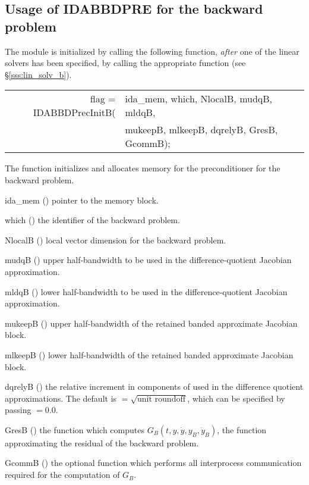 \subsection{Usage of IDABBDPRE for the backward problem}
The {\idabbdpre} module is initialized by calling the following function,
{\em after} one of the {\idaspils} linear solvers has been specified,
by calling the appropriate function (see \S\ref{sss:lin_solv_b}).
{
  \begin{tabular}[t]{@{}r@{}l@{}}
    flag = IDABBDPrecInitB(&ida\_mem, which, NlocalB, mudqB, mldqB,\\
                           &mukeepB, mlkeepB, dqrelyB, GresB, GcommB);
  \end{tabular}
}
{
  The function  initializes and allocates
  memory for the {\idabbdpre} preconditioner for the backward problem.
}
{
  \begin{args}
  \item[ida\_mem] ()
    pointer to the {\idas} memory block.
  \item[which] ()
    the identifier of the backward problem.
  \item[NlocalB] ()
    local vector dimension for the backward problem.
  \item[mudqB] ()
    upper half-bandwidth to be used in the difference-quotient Jacobian approximation.
  \item[mldqB] ()
    lower half-bandwidth to be used in the difference-quotient Jacobian approximation.
  \item[mukeepB] ()
    upper half-bandwidth of the retained banded approximate Jacobian block.
  \item[mlkeepB] ()
    lower half-bandwidth of the retained banded approximate Jacobian block.
  \item[dqrelyB] ()
    the relative increment in components of  used in the difference quotient
    approximations.  The default is $ = \sqrt{\text{unit roundoff}}$, which
    can be specified by passing $ = 0.0$.
  \item[GresB] ()
    the {\CC} function which computes $G_B(t,y,\dot y, y_B, \dot y_B)$, the
    function approximating the residual of the backward problem. 
  \item[GcommB] ()
    the optional {\CC} function which performs all interprocess communication required for
    the computation of $G_B$.
  \end{args}
}
